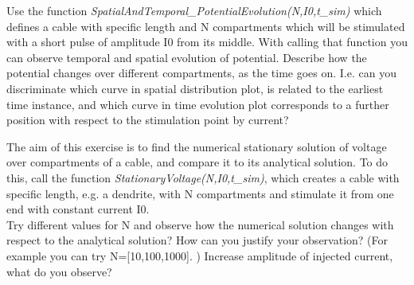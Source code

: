 \documentclass[a4paper,10pt]{Exercises}
\begin{document}
Use the function \textit{SpatialAndTemporal\_PotentialEvolution(N,I0,t\_sim)} which defines a cable  with specific length and N compartments which will be stimulated with a short pulse of amplitude I0 from its middle. With calling that function you can observe temporal and spatial evolution of potential.
\Question Describe how the potential changes over different compartments, as the time goes on. I.e. can you discriminate which curve in spatial distribution plot, is related to the earliest time instance, and which curve in time evolution plot corresponds to a further position with respect to the stimulation point by current?

\Exercise[]

The aim of this exercise is to find the numerical stationary solution of voltage over compartments of a cable, and compare it to its analytical solution.
To do this, call the function \textit{StationaryVoltage(N,I0,t\_sim)}, which creates a  cable with specific length, e.g. a dendrite, with N compartments and stimulate it from one end with constant current I0.\\


\Question  Try different values for N and observe how the numerical solution changes with respect to the analytical solution? How can you justify your observation?
(For example you can try N=[10,100,1000]. )
\Question Increase amplitude of injected current, what do you observe?



\end{document}
